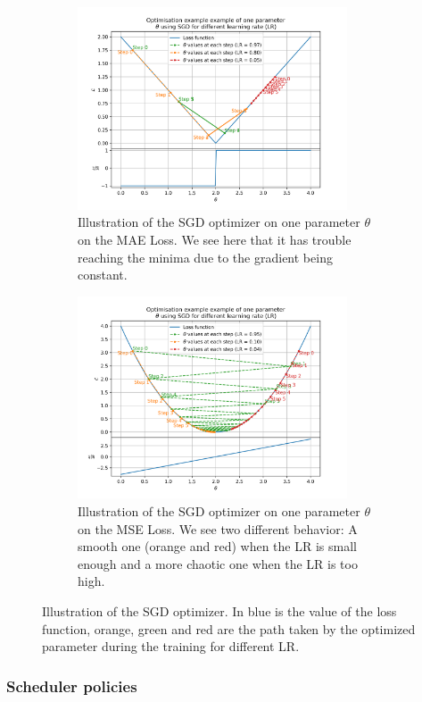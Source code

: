 \documentclass[../main.tex]{subfiles}
\begin{document}
\begin{figure}
  \centering
  \begin{subfigure}[t]{0.48\linewidth}
    \includegraphics[height=6cm]{scripts/plots/MAE_illustration.png}
    \caption{Illustration of the SGD optimizer on one parameter $\theta$ on the MAE Loss. We see here that it has trouble reaching the minima due to the gradient being constant.}
    \label{fig:ml:optims:mae}
  \end{subfigure}
  \hfill
  \begin{subfigure}[t]{0.48\linewidth}
    \includegraphics[height=6cm]{scripts/plots/MSE_illustration.png}
    \caption{Illustration of the SGD optimizer on one parameter $\theta$ on the MSE Loss. We see two different behavior: A smooth one (orange and red) when the LR is small enough and a more chaotic one when the LR is too high.}
    \label{fig:ml:optims:mse}
  \end{subfigure}
  \caption{Illustration of the SGD optimizer. In blue is the value of the loss function, orange, green and red are the path taken by the optimized parameter during the training for different LR.}
  \label{fig:ml:optims}
\end{figure}

\subsubsection{Scheduler policies}
\end{document}
